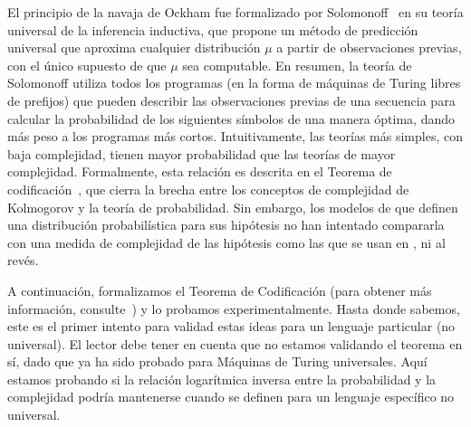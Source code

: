 El principio de la navaja de Ockham fue formalizado por Solomonoff~\cite{solomonoff1964formal} en su teoría universal de la inferencia inductiva, que propone un método de predicción universal que aproxima cualquier distribución $\mu$ a partir de observaciones previas, con el único supuesto de que $\mu$ sea computable. En resumen, la teoría de Solomonoff utiliza todos los programas (en la forma de máquinas de Turing libres de prefijos) que pueden describir las observaciones previas de una secuencia para calcular la probabilidad de los siguientes símbolos de una manera óptima, dando más peso a los programas más cortos. Intuitivamente, las teorías más simples, con baja complejidad, tienen mayor probabilidad que las teorías de mayor complejidad. Formalmente, esta relación es descrita en el Teorema de codificación~\cite{levin1974laws}, que cierra la brecha entre los conceptos de complejidad de Kolmogorov y la teoría de probabilidad. Sin embargo, los modelos de \lot que definen una distribución probabilística para sus hipótesis no han intentado compararla con una medida de complejidad de las hipótesis como las que se usan en \mdlgeo, ni al revés.


A continuación, formalizamos el Teorema de Codificación (para obtener más información, consulte~\cite{li2013introduction}) y lo probamos experimentalmente. Hasta donde sabemos, este es el primer intento para validad estas ideas para un lenguaje particular (no universal). El lector debe tener en cuenta que no estamos validando el teorema en sí, dado que ya ha sido probado para Máquinas de Turing universales. Aquí estamos probando si la relación logarítmica inversa entre la probabilidad y la complejidad podría mantenerse cuando se definen para un lenguaje específico no universal.

